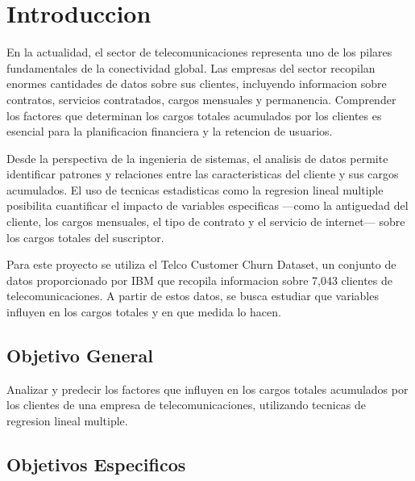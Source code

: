 \documentclass[12pt,a4paper]{article}
\begin{document}
\newpage
\tableofcontents
\newpage

\section{Introduccion}

En la actualidad, el sector de telecomunicaciones representa uno de los pilares fundamentales de la conectividad global. Las empresas del sector recopilan enormes cantidades de datos sobre sus clientes, incluyendo informacion sobre contratos, servicios contratados, cargos mensuales y permanencia. Comprender los factores que determinan los cargos totales acumulados por los clientes es esencial para la planificacion financiera y la retencion de usuarios.

Desde la perspectiva de la ingenieria de sistemas, el analisis de datos permite identificar patrones y relaciones entre las caracteristicas del cliente y sus cargos acumulados. El uso de tecnicas estadisticas como la regresion lineal multiple posibilita cuantificar el impacto de variables especificas ---como la antiguedad del cliente, los cargos mensuales, el tipo de contrato y el servicio de internet--- sobre los cargos totales del suscriptor.

Para este proyecto se utiliza el Telco Customer Churn Dataset, un conjunto de datos proporcionado por IBM que recopila informacion sobre 7,043 clientes de telecomunicaciones. A partir de estos datos, se busca estudiar que variables influyen en los cargos totales y en que medida lo hacen.

\subsection{Objetivo General}

Analizar y predecir los factores que influyen en los cargos totales acumulados por los clientes de una empresa de telecomunicaciones, utilizando tecnicas de regresion lineal multiple.

\subsection{Objetivos Especificos}
\end{document}
